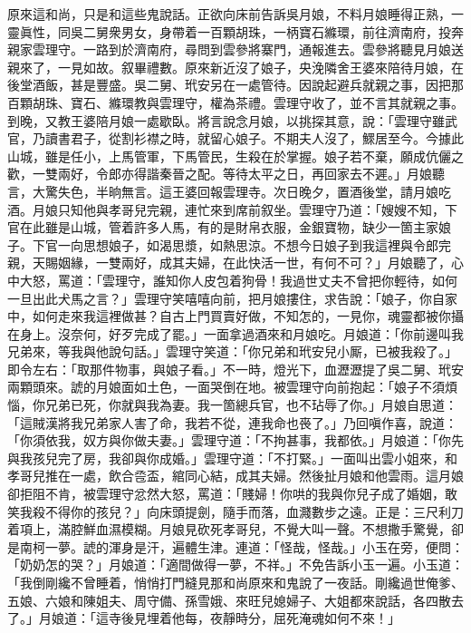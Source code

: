 原來這和尚，只是和這些鬼說話。正欲向床前告訴吳月娘，不料月娘睡得正熟，一靈眞性，同吳二舅衆男女，身帶着一百顆胡珠，一柄寶石縧環，前往濟南府，投奔親家雲理守。一路到於濟南府，尋問到雲參將寨門，通報進去。雲參將聽見月娘送親來了，一見如故。叙畢禮數。原來新近沒了娘子，央浼隣舍王婆來陪待月娘，在後堂酒飯，甚是豐盛。吳二舅、玳安另在一處管待。因說起避兵就親之事，因把那百顆胡珠、寶石、縧環教與雲理守，權為茶禮。雲理守收了，並不言其就親之事。到晚，又教王婆陪月娘一處歇臥。將言說念月娘，以挑探其意，說：「雲理守雖武官，乃讀書君子，從割衫襟之時，就留心娘子。{}不期夫人沒了，鰥居至今。今據此山城，雖是任小，上馬管軍，下馬管民，生殺在於掌握。娘子若不棄，願成伉儷之歡，一雙兩好，令郎亦得諧秦晉之配。等待太平之日，再回家去不遲。」月娘聽言，大驚失色，半晌無言。這王婆回報雲理寺。次日晚夕，置酒後堂，請月娘吃酒。月娘只知他與孝哥兒完親，連忙來到席前叙坐。雲理守乃道：「嫂嫂不知，下官在此雖是山城，管着許多人馬，有的是財帛衣服，金銀寶物，缺少一箇主家娘子。下官一向思想娘子，如渴思漿，如熱思涼。不想今日娘子到我這裡與令郎完親，天賜姻緣，一雙兩好，成其夫婦，在此快活一世，有何不可？」月娘聽了，心中大怒，罵道：「雲理守，誰知你人皮包着狗骨！我過世丈夫不曾把你輕待，{}如何一旦出此犬馬之言？」雲理守笑嘻嘻向前，把月娘摟住，求告說：「娘子，你自家中，如何走來我這裡做甚？自古上門買賣好做，不知怎的，一見你，魂靈都被你攝在身上。沒奈何，好歹完成了罷。」一面拿過酒來和月娘吃。月娘道：「你前邊叫我兄弟來，等我與他說句話。」雲理守笑道：「你兄弟和玳安兒小厮，已被我殺了。」即令左右：「取那件物事，與娘子看。」不一時，燈光下，血瀝瀝提了吳二舅、玳安兩顆頭來。諕的月娘面如土色，一面哭倒在地。被雲理守向前抱起：「娘子不須煩惱，你兄弟已死，你就與我為妻。我一箇總兵官，也不玷辱了你。」月娘自思道：「這賊漢將我兄弟家人害了命，我若不從，連我命也䘮了。」乃回嗔作喜，說道：「你須依我，奴方與你做夫妻。」雲理守道：「不拘甚事，我都依。」月娘道：「你先與我孩兒完了房，我卻與你成婚。」雲理守道：「不打緊。」一面叫出雲小姐來，和孝哥兒推在一處，飲合卺盃，綰同心結，成其夫婦。然後扯月娘和他雲雨。這月娘卻拒阻不肯，被雲理守忿然大怒，罵道：「賤婦！你哄的我與你兒子成了婚姻，敢笑我殺不得你的孩兒？」向床頭提劍，隨手而落，血濺數步之遠。正是：三尺利刀着項上，滿腔鮮血濕模糊。月娘見砍死孝哥兒，不覺大叫一聲。不想撒手驚覺，卻是南柯一夢。諕的渾身是汗，遍體生津。連道：「怪哉，怪哉。」小玉在旁，便問：「奶奶怎的哭？」月娘道：「適間做得一夢，不祥。」不免告訴小玉一遍。小玉道：「我倒剛纔不曾睡着，悄悄打門縫見那和尚原來和鬼說了一夜話。剛纔過世俺爹、五娘、六娘和陳姐夫、周守備、孫雪娥、來旺兒媳婦子、大姐都來說話，各四散去了。」月娘道：「這寺後見埋着他每，夜靜時分，屈死淹魂如何不來！」

